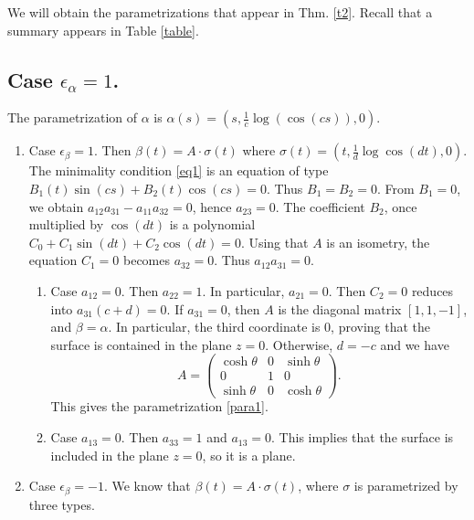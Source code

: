 \documentclass[a4paper,12pt]{amsart}
\numberwithin{equation}{section}
\theoremstyle{definition}
\begin{document}
We will obtain the parametrizations that appear in Thm. \ref{t2}.  Recall that a summary appears in Table  \ref{table}.

\subsection{Case $\epsilon_\alpha=1$.}
The parametrization of $\alpha$ is $\alpha(s)=(s,\frac{1}{c}\log(\cos(cs)),0)$.
\begin{enumerate}
\item Case $\epsilon_\beta=1$. Then  $\beta(t)=A\cdot\sigma(t)$ where $\sigma(t)=(t,\frac{1}{d}\log\cos(dt),0)$. The minimality condition \eqref{eq1} is an equation of type $B_1(t)\sin(cs)+B_2(t)\cos(cs)=0$. Thus $B_1=B_2=0$. From $B_1=0$, we obtain $a_{12} a_{31}-a_{11} a_{32}=0$, hence $a_{23}=0$.
The coefficient $B_2$, once multiplied by $\cos(dt)$ is a polynomial $C_0+C_1\sin(dt)+C_2\cos(dt)=0$. Using that $A$ is an isometry, the equation $C_1=0$ becomes $a_{32}=0$.  Thus $a_{12}a_{31}=0$. 
\begin{enumerate}
\item Case $a_{12}=0$. Then $a_{22}=1$. In particular, $a_{21}=0$. Then $C_2=0$ reduces into $a_{31}(c+d)=0$. If $a_{31}=0$, then $A$ is the diagonal matrix $[1,1,-1]$, and $\beta=\alpha$. In particular, the third coordinate is $0$, proving that the surface is contained in the plane $z=0$. Otherwise, $d=-c$ and we have    $$A=\begin{pmatrix}\cosh\theta&0&\sinh\theta\\ 0&1&0\\ \sinh\theta&0&\cosh\theta\end{pmatrix}.$$
This gives the parametrization \eqref{para1}.
\item Case $a_{13}=0$. Then $a_{33}=1$ and  $a_{13}=0$. 
This implies that the surface is included in the plane $z=0$, so it is a plane. 
\end{enumerate}



\item Case $\epsilon_\beta=-1$.
  We know that $\beta(t)=A\cdot \sigma(t)$, where  $\sigma$ is parametrized by three types.

\begin{enumerate}
 

\end{enumerate}
\end{enumerate}
\end{document}
